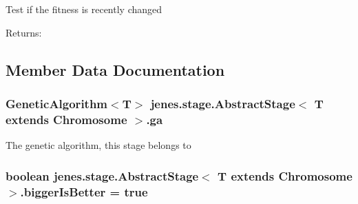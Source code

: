 Test if the fitness is recently changed \begin{Desc}
\item[Returns:]\end{Desc}


\subsection{Member Data Documentation}
\hypertarget{classjenes_1_1stage_1_1_abstract_stage_3_01_t_01extends_01_chromosome_01_4_751aba4f46b29d22592d48422ffa75f9}{
\subsubsection[ga]{\setlength{\rightskip}{0pt plus 5cm}GeneticAlgorithm$<$T$>$ jenes.stage.AbstractStage$<$ T extends Chromosome $>$.{\bf ga}}}
\label{classjenes_1_1stage_1_1_abstract_stage_3_01_t_01extends_01_chromosome_01_4_751aba4f46b29d22592d48422ffa75f9}


The genetic algorithm, this stage belongs to \hypertarget{classjenes_1_1stage_1_1_abstract_stage_3_01_t_01extends_01_chromosome_01_4_11da35af3fe950eef9882b03e13690d4}{
\subsubsection[biggerIsBetter]{\setlength{\rightskip}{0pt plus 5cm}boolean jenes.stage.AbstractStage$<$ T extends Chromosome $>$.{\bf biggerIsBetter} = true}}
\label{classjenes_1_1stage_1_1_abstract_stage_3_01_t_01extends_01_chromosome_01_4_11da35af3fe950eef9882b03e13690d4}


